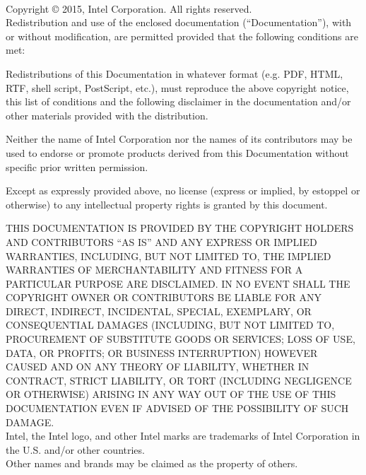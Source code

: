 
\vspace*{3.0cm}
 \\ 

\vspace*{0.5cm}

\noindent Copyright {\small\copyright} 2015, Intel Corporation. All rights reserved. \\

\noindent Redistribution and use of the enclosed documentation
(``Documentation''),  with or without modification, are permitted provided that
the following conditions are met:

\begin{itemize*}
\item Redistributions of this Documentation in whatever format (e.g. PDF,
         HTML, RTF, shell script, PostScript, etc.), must reproduce the above
         copyright notice, this list of conditions and the following disclaimer
         in the documentation and/or other materials provided with the
         distribution.

\item  Neither the name of Intel Corporation nor the names of its
         contributors may be used to endorse or promote products derived from
         this Documentation without specific prior written permission.
\end{itemize*}

\noindent Except as expressly provided above, no license (express or implied, by estoppel
or otherwise) to any intellectual property rights is granted by this document.

\vspace*{0.5cm}

{\footnotesize

\noindent THIS DOCUMENTATION IS PROVIDED BY THE COPYRIGHT HOLDERS AND
CONTRIBUTORS ``AS IS'' AND ANY EXPRESS OR IMPLIED WARRANTIES, INCLUDING, BUT
NOT LIMITED TO, THE IMPLIED WARRANTIES OF MERCHANTABILITY AND FITNESS FOR A
PARTICULAR PURPOSE ARE DISCLAIMED. IN NO EVENT SHALL THE COPYRIGHT OWNER OR
CONTRIBUTORS BE LIABLE FOR ANY DIRECT, INDIRECT, INCIDENTAL, SPECIAL,
EXEMPLARY, OR CONSEQUENTIAL DAMAGES (INCLUDING, BUT NOT LIMITED TO, PROCUREMENT
OF SUBSTITUTE GOODS OR SERVICES; LOSS OF USE, DATA, OR PROFITS; OR BUSINESS
INTERRUPTION) HOWEVER CAUSED AND ON ANY THEORY OF LIABILITY, WHETHER IN
CONTRACT, STRICT LIABILITY, OR TORT (INCLUDING NEGLIGENCE OR OTHERWISE) ARISING
IN ANY WAY OUT OF THE USE OF THIS DOCUMENTATION EVEN IF ADVISED OF THE
POSSIBILITY OF SUCH DAMAGE. \\

\noindent Intel, the Intel logo, and other Intel marks are trademarks of Intel
Corporation in the U.S. and/or other countries. \\

\noindent *Other names and brands may be claimed as the property of others. \\



}

